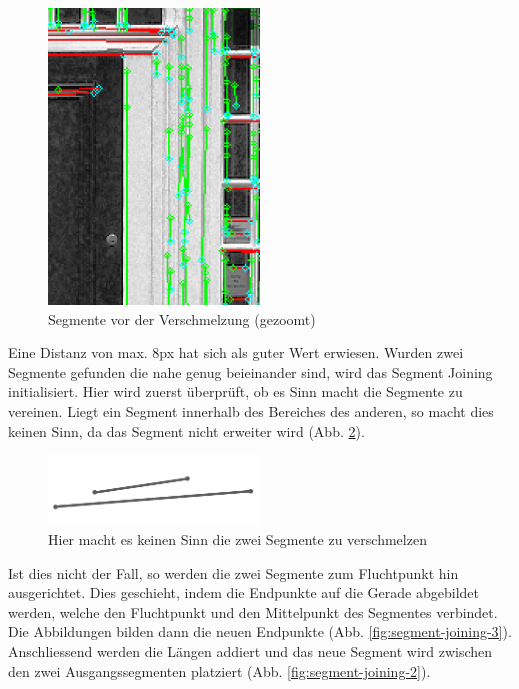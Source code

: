 \begin{figure}[!ht]
\centering
\includegraphics[width=0.5\textwidth]{images/segments-pre-join} 
\caption{Segmente vor der Verschmelzung (gezoomt)}
\label{fig:segments-pre-join}
\end{figure}
\noindent
Eine Distanz von max. 8px hat sich als guter Wert erwiesen. Wurden zwei Segmente gefunden die nahe genug beieinander sind, wird das Segment Joining initialisiert. Hier wird zuerst überprüft, ob es Sinn macht die Segmente zu vereinen. Liegt ein Segment innerhalb des Bereiches des anderen, so macht dies keinen Sinn, da das Segment nicht erweiter wird (Abb. \ref{fig:segment-joining-1}).

\begin{figure}[!ht]
\centering
\includegraphics[width=0.5\textwidth]{images/segment-joining-1} 
\caption{Hier macht es keinen Sinn die zwei Segmente zu verschmelzen}
\label{fig:segment-joining-1}
\end{figure}
\noindent
Ist dies nicht der Fall, so werden die zwei Segmente zum Fluchtpunkt hin ausgerichtet. Dies geschieht, indem die Endpunkte auf die Gerade abgebildet werden, welche den Fluchtpunkt und den Mittelpunkt des Segmentes verbindet. Die Abbildungen bilden dann die neuen Endpunkte (Abb. \ref{fig:segment-joining-3}). Anschliessend werden die Längen addiert und das neue Segment wird zwischen den zwei Ausgangssegmenten platziert (Abb. \ref{fig:segment-joining-2}).

